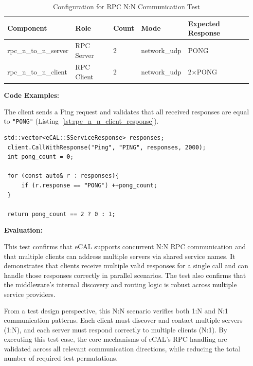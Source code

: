 \vspace{0.4em}
\begin{table}[H]
	\centering
	\begin{tabular}{@{}lllll@{}}
		\toprule
		\textbf{Component} & \textbf{Role} & \textbf{Count} & \textbf{Mode} & \textbf{Expected Response} \\
		\midrule
		rpc\_n\_to\_n\_server & RPC Server & 2 & network\_udp & PONG \\
		rpc\_n\_to\_n\_client & RPC Client & 2 & network\_udp & 2×PONG \\
		\bottomrule
	\end{tabular}
	\caption{Configuration for RPC N:N Communication Test}
	\label{tab:rpc_n_n_test}
\end{table}

\vspace{0.5em}
\textbf{Code Examples:}

The client sends a Ping request and validates that all received responses are equal to \texttt{"PONG"} (Listing~\ref{lst:rpc_n_n_client_response}).

\begin{lstlisting}[style=cppstyle, caption={RPC Client receives multiple responses}, label={lst:rpc_n_n_client_response}, captionpos=b]
 std::vector<eCAL::SServiceResponse> responses;
 client.CallWithResponse("Ping", "PING", responses, 2000);
 int pong_count = 0;
	
 for (const auto& r : responses){
     if (r.response == "PONG") ++pong_count;
 }
 
 return pong_count == 2 ? 0 : 1;
\end{lstlisting}

\vspace{0.4em}
\textbf{Evaluation:}

\vspace{0.4em}
This test confirms that eCAL supports concurrent N:N RPC communication and that multiple clients can address multiple servers via shared service names. It demonstrates that clients receive multiple valid responses for a single call and can handle those responses correctly in parallel scenarios. The test also confirms that the middleware’s internal discovery and routing logic is robust across multiple service providers.

\vspace{1em}
From a test design perspective, this N:N scenario verifies both 1:N and N:1 communication patterns. Each client must discover and contact multiple servers (1:N), and each server must respond correctly to multiple clients (N:1). By executing this test case, the core mechanisms of eCAL's RPC handling are validated across all relevant communication directions, while reducing the total number of required test permutations.

